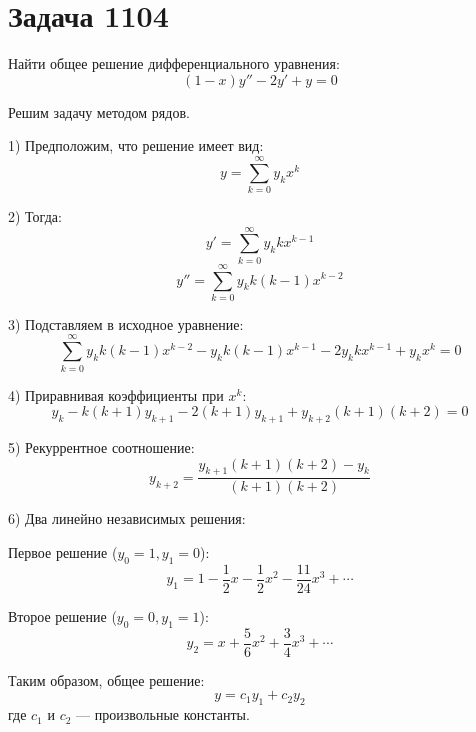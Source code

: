 \section*{Задача 1104}
Найти общее решение дифференциального уравнения:
$$(1 - x)y'' - 2y' + y = 0$$

\begin{solution}
   Решим задачу методом рядов.

   1) Предположим, что решение имеет вид:
   $$y = \sum_{k = 0}^{\infty} y_k x^k$$

   2) Тогда:
   $$y' = \sum_{k = 0}^{\infty} y_k k x^{k-1}$$
   $$y'' = \sum_{k = 0}^{\infty} y_k k(k-1) x^{k-2}$$

   3) Подставляем в исходное уравнение:
   $$\sum_{k = 0}^{\infty} y_k k(k-1)x^{k-2} - y_k k(k-1)x^{k-1} - 2y_k kx^{k-1} + y_k x^k = 0$$

   4) Приравнивая коэффициенты при $x^k$:
   $$y_k - k(k+1)y_{k+1} - 2(k+1)y_{k+1} + y_{k+2}(k+1)(k+2) = 0$$

   5) Рекуррентное соотношение:
   $$y_{k+2} = \frac{y_{k+1}(k+1)(k+2) - y_k}{(k+1)(k+2)}$$

   6) Два линейно независимых решения:

   Первое решение ($y_0 = 1, y_1 = 0$):
   $$y_1 = 1 - \frac{1}{2}x - \frac{1}{2}x^2 - \frac{11}{24}x^3 + \cdots$$

   Второе решение ($y_0 = 0, y_1 = 1$):
   $$y_2 = x + \frac{5}{6}x^2 + \frac{3}{4}x^3 + \cdots$$

   Таким образом, общее решение:
   $$y = c_1y_1 + c_2y_2$$
   где $c_1$ и $c_2$ — произвольные константы.
\end{solution}